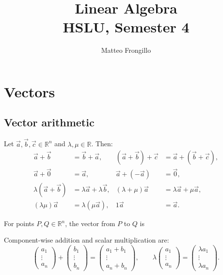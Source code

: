 \documentclass{article}
\title{\textbf{Linear Algebra \\ HSLU, Semester 4}}
\author{Matteo Frongillo}
\date{}
\begin{document}
\maketitle
\tableofcontents
\pagebreak

\section{Vectors}

\subsection{Vector arithmetic}
Let $\vec{a},\vec{b},\vec{c}\in\mathbb{R}^n$ and
$\lambda,\mu\in\mathbb{R}$. Then:
\begin{align*}
    \vec{a}+\vec{b}&=\vec{b}+\vec{a},&
    (\vec{a}+\vec{b})+\vec{c}&=\vec{a}+(\vec{b}+\vec{c}),\\
    \vec{a}+\vec{0}&=\vec{a},&
    \vec{a}+(-\vec{a})&=\vec{0},\\
    \lambda(\vec{a}+\vec{b})&=\lambda\vec{a}+\lambda\vec{b},&
    (\lambda+\mu)\vec{a}&=\lambda\vec{a}+\mu\vec{a},\\
    (\lambda\mu)\vec{a}&=\lambda(\mu\vec{a}),&
    1\vec{a}&=\vec{a}.
\end{align*}

For points $P,Q\in\mathbb{R}^n$, the vector from $P$ to $Q$ is

Component-wise addition and scalar multiplication are:
\[
    \begin{pmatrix}a_1\\ \vdots\\a_n\end{pmatrix}
    +\begin{pmatrix}b_1\\ \vdots\\b_n\end{pmatrix}
    =\begin{pmatrix}a_1+b_1\\ \vdots\\a_n+b_n\end{pmatrix},
    \qquad
    \lambda\begin{pmatrix}a_1\\ \vdots\\a_n\end{pmatrix}
    =\begin{pmatrix}\lambda a_1\\ \vdots\\\lambda a_n\end{pmatrix}.
\]
\end{document}
